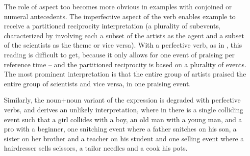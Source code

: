 \documentclass[output=paper,colorlinks,citecolor=brown]{langscibook}
\begin{document}
The role of aspect too becomes more obvious in examples with conjoined or numeral antecedents. The imperfective aspect of the verb enables example  to receive a partitioned reciprocity interpretation (a plurality of subevents, characterized by involving each a subset of the artists as the agent and a subset of the scientists as the theme or vice versa). With a perfective verb, as in , this reading is difficult to get, because it only allows for one event of praising per reference time -- and the partitioned reciprocity is based on a plurality of events. The most prominent interpretation is that the entire group of artists praised the entire group of scientists and vice versa, in one praising event.

\ea\label{Umetnici3} 
\label{Umetnici3-a}

\label{Umetnici3-b}
 \z \z

\noindent Similarly, the noun$+$noun variant of the expression is degraded with perfective verbs, and derives an unlikely interpretation, where in  there is a single colliding event such that a girl collides with a boy, an old man with a young man, and a pro with a beginner, one snitching event where a father snitches on his son, a sister on her brother and a teacher on his student and one selling event where a hairdresser sells scissors, a tailor needles and a cook his pots.

\ea\label{Klizači3} 
\label{Klizači3-a}
\end{document}
